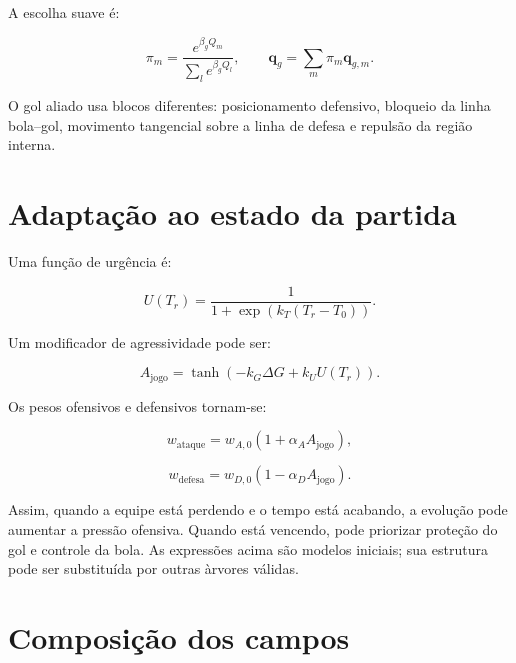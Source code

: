 \documentclass[12pt,a4paper]{article}
\newcommand{\vect}[1]{\boldsymbol{#1}}
\begin{document}
A escolha suave \'e:

\begin{equation}
  \pi_m=\frac{e^{\beta_gQ_m}}{\sum_l e^{\beta_gQ_l}},\qquad
  \vect{q}_g=\sum_m\pi_m\vect{q}_{g,m}.
\end{equation}

O gol aliado usa blocos diferentes: posicionamento defensivo, bloqueio da linha bola--gol, movimento tangencial sobre a linha de defesa e repuls\~ao da regi\~ao interna.

\section{Adapta\c{c}\~ao ao estado da partida}

Uma fun\c{c}\~ao de urg\^encia \'e:

\begin{equation}
  U(T_r)=\frac{1}{1+\exp(k_T(T_r-T_0))}.
\end{equation}

Um modificador de agressividade pode ser:

\begin{equation}
  A_{\mathrm{jogo}}=\tanh(-k_G\Delta G+k_UU(T_r)).
\end{equation}

Os pesos ofensivos e defensivos tornam-se:

\begin{equation}
  w_{\mathrm{ataque}}=w_{A,0}(1+\alpha_AA_{\mathrm{jogo}}),
\end{equation}

\begin{equation}
  w_{\mathrm{defesa}}=w_{D,0}(1-\alpha_DA_{\mathrm{jogo}}).
\end{equation}

Assim, quando a equipe est\'a perdendo e o tempo est\'a acabando, a evolu\c{c}\~ao pode aumentar a press\~ao ofensiva. Quando est\'a vencendo, pode priorizar prote\c{c}\~ao do gol e controle da bola. As express\~oes acima s\~ao modelos iniciais; sua estrutura pode ser substitu\'ida por outras \`arvores v\'alidas.

\section{Composi\c{c}\~ao dos campos}
\end{document}
